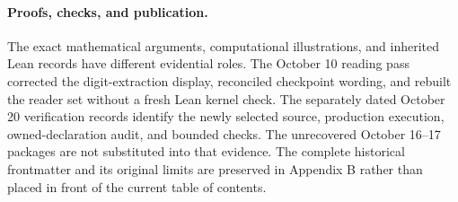 \paragraph{Proofs, checks, and publication.}
The exact mathematical arguments, computational illustrations, and inherited
Lean records have different evidential roles. The October 10 reading pass corrected
the digit-extraction display, reconciled checkpoint wording, and rebuilt the
reader set without a fresh Lean kernel check. The separately dated October 20
verification records identify the newly selected source, production execution,
owned-declaration audit, and bounded checks. The unrecovered October 16--17
packages are not substituted into that evidence. The complete historical
frontmatter and its original limits are preserved in Appendix B rather than
placed in front of the current table of contents.
